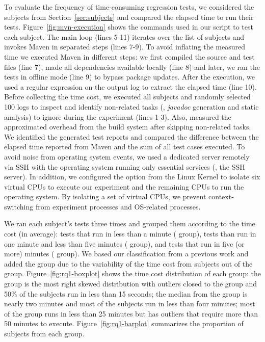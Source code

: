 To evaluate the frequency of time-consuming regression tests, we
considered the \numSubjs{} subjects from Section~\ref{sec:subjects}
and compared the elapsed time to run their tests.
Figure~\ref{fig:mvn-execution} shows the commands used in our script
to test each subject. The main loop (lines 5-11) iterates over the
list of subjects and invokes Maven in separated steps (lines 7-9). To
avoid inflating the measured time we executed Maven in different
steps: we first compiled the source and test files (line 7), made all
dependencies available locally (line 8) and later, we ran the tests in
offline mode (line 9) to bypass package updates. After the execution,
we used a regular expression on the output log to extract the elapsed
time (line 10). Before collecting the time cost, we executed all
subjects and randomly selected 100 logs to inspect and identify
non-related tasks (\eg, \emph{javadoc} generation and static analysis)
to ignore during the experiment (lines 1-3).  Also, measured the
approximated overhead from the build system after skipping non-related
tasks. We identified the generated test reports and compared the
difference between the elapsed time reported from Maven and the sum of
all test cases executed.
To avoid noise from operating system events, we used a dedicated
server remotely via SSH with the operating system running only
essential services (\eg, the SSH server). In addition, we configured
the  option from the Linux Kernel \cite{linux-kernel}
to isolate six virtual CPUs to execute our experiment and the
remaining CPUs to run the operating system. By isolating a set of
virtual CPUs, we prevent context-switching from experiment processes
and OS-related processes.




We ran each subject's tests three times and grouped them according to
the time cost (in average): tests that run in less than a minute
(\shortg{} group), tests than run in one minute and less than five
minutes (\medg{} group), and tests that run in five (or more) minutes
(\longg{} group). We based our classification from a previous work
\cite{gligoric-etal-issta2015} and added the \medg{} group due to the
variability of the time cost from subjects out of the \shortg{} group.
Figure~\ref{fig:rq1-boxplot} shows the time cost distribution of each
group: the \shortg{} group is the most right skewed distribution with
outliers closed to the \medg{} group and 50\% of the subjects run in
less than 15 seconds; the median from the \medg{} group is nearly two
minutes and most of the subjects run in less than four minutes; most
of the \longg{} group runs in less than 25 minutes but has outliers
that require more than 50 minutes to execute.
Figure~\ref{fig:rq1-barplot} summarizes the proportion of subjects
from each group.

